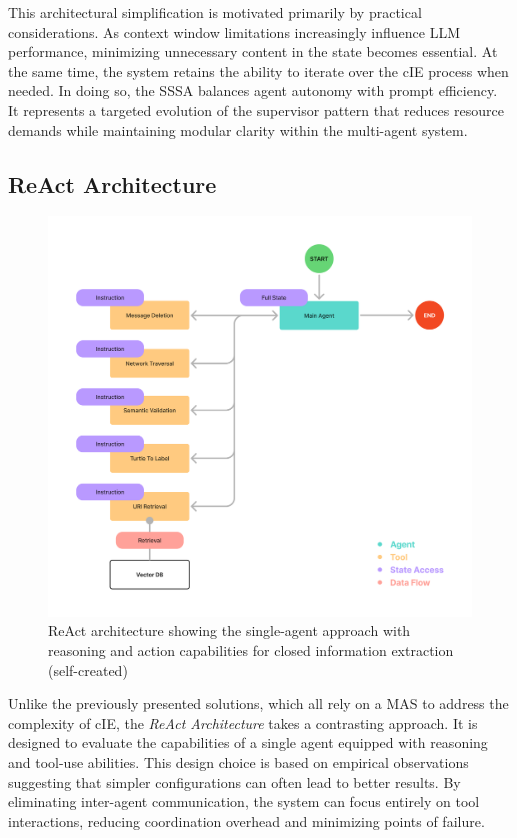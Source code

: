 \documentclass[a4paper,oneside,bibliography=totoc]{scrbook}
\begin{document}
This architectural simplification is motivated primarily by practical considerations. As context window limitations increasingly influence \ac{LLM} performance, minimizing unnecessary content in the state becomes essential. At the same time, the system retains the ability to iterate over the \ac{cIE} process when needed. In doing so, the \ac{SSSA} balances agent autonomy with prompt efficiency. It represents a targeted evolution of the supervisor pattern that reduces resource demands while maintaining modular clarity within the multi-agent system.

\subsection{ReAct Architecture}
\label{subsec:react}

\begin{figure}[h]
  \centering
  \includegraphics[width=\textwidth]{figures/ReAct Architecture.png}
  \caption[ReAct architecture showing the single-agent approach with reasoning and action capabilities for closed information extraction]{ReAct architecture showing the single-agent approach with reasoning and action capabilities for closed information extraction (self-created)}
  \label{fig:react_architecture}
\end{figure}

Unlike the previously presented solutions, which all rely on a \ac{MAS} to address the complexity of \ac{cIE}, the \textit{ReAct Architecture} takes a contrasting approach. It is designed to evaluate the capabilities of a single agent equipped with reasoning and tool-use abilities. This design choice is based on empirical observations suggesting that simpler configurations can often lead to better results. By eliminating inter-agent communication, the system can focus entirely on tool interactions, reducing coordination overhead and minimizing points of failure.
\end{document}

